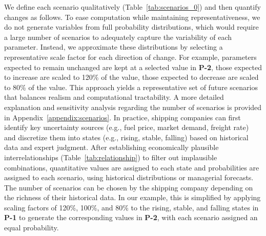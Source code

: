 \documentclass[11pt,english]{article}
\begin{document}
We define each scenario qualitatively (Table~\ref{tab:scenarios_0}) and then quantify changes as follows. To ease computation while maintaining representativeness, we do not generate variables from full probability distributions, which would require a large number of scenarios to adequately capture the variability of each parameter. Instead, we approximate these distributions by selecting a representative scale factor for each direction of change. For example, parameters expected to remain unchanged are kept at a selected value in \textbf{P-2}, those expected to increase are scaled to 120\% of the value, those expected to decrease are scaled to 80\% of the value. This approach yields a representative set of future scenarios that balances realism and computational tractability. A more detailed explanation and sensitivity analysis regarding the number of scenarios is provided in Appendix~\ref{appendix:scenarios}. In practice, shipping companies can first identify key uncertainty sources (e.g., fuel price, market demand, freight rate) and discretize them into states (e.g., rising, stable, falling) based on historical data and expert judgment. After establishing economically plausible interrelationships (Table~\ref{tab:relationship}) to filter out implausible combinations, quantitative values are assigned to each state and probabilities are assigned to each scenario, using historical distributions or managerial forecasts. The number of scenarios can be chosen by the shipping company depending on the richness of their historical data. In our example, this is simplified by applying scaling factors of 120\%, 100\%, and 80\% to the rising, stable, and falling states in \textbf{P-1} to generate the corresponding values in \textbf{P-2}, with each scenario assigned an equal probability.
\end{document}
